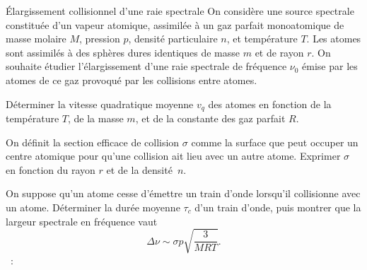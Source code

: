 \begin{exo}[PC][1][colle]{Élargissement collisionnel d’une raie spectrale}
  On considère une source spectrale constituée d’un vapeur atomique, assimilée à un gaz parfait monoatomique de masse molaire $M$, pression $p$, densité particulaire $n$, et température $T$. Les atomes sont assimilés à des sphères dures identiques de masse $m$ et de rayon $r$. On souhaite étudier l’élargissement d’une raie spectrale de fréquence $\nu_0$ émise par les atomes de ce gaz provoqué par les collisions entre atomes.
  \begin{quest}
    \item Déterminer la vitesse quadratique moyenne $v_q$ des atomes en fonction de la température $T$, de la masse $m$, et de la constante des gaz parfait $R$.
    \item On définit la section efficace de collision $\sigma$ comme la surface que peut occuper un centre atomique pour qu’une collision ait lieu avec un autre atome. Exprimer $\sigma$ en fonction du rayon $r$ et de la densité~$n$.
    \item	On suppose qu’un atome cesse d’émettre un train d’onde lorsqu’il collisionne avec un atome. Déterminer la durée moyenne $\tau_c$ d’un train d’onde, puis montrer que la largeur spectrale en fréquence vaut
    $$
    \Delta \nu \sim \sigma p \sqrt{\frac{3}{M RT}}.
    $$
    \AN~: 
  \end{quest}
\end{exo}

